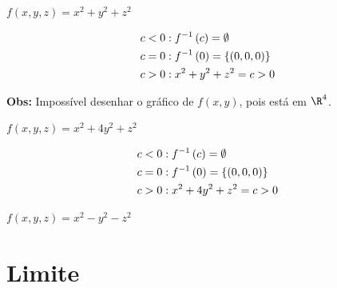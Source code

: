 \documentclass[11pt, oneside, a4paper]{gsm-l}
\begin{document}
\newpage

\begin{exem}
$f\left( {x,y,z} \right) = x^2  + y^2  + z^2$
\end{exem}

\begin{sol}
\[
\begin{gathered}
c < 0:f^{ - 1} \left( c \right) = \emptyset  \hfill \\
  c = 0:f^{ - 1} \left( 0 \right) = \left\{ {\left( {0,0,0} \right)} \right\} \hfill \\
c > 0:x^2  + y^2  + z^2  = c > 0 \hfill \\
\end{gathered}
\]



\textbf{Obs:} Impossível desenhar o gráfico de $f(x,y)$, pois está em $\R^4$.
\end{sol}

\begin{exem}
$f\left( {x,y,z} \right) = x^2  + 4y^2  + z^2$
\end{exem}

\begin{sol}
\[
\begin{gathered}
c < 0:f^{ - 1} \left( c \right) = \emptyset  \hfill \\
  c = 0:f^{ - 1} \left( 0 \right) = \left\{ {\left( {0,0,0} \right)} \right\} \hfill \\
c > 0:x^2  + 4y^2  + z^2  = c > 0 \hfill \\
\end{gathered}
\]


\end{sol}

\begin{exem}
$f\left( {x,y,z} \right) = x^2  - y^2  - z^2$
\end{exem}

\section{Limite} \label{sec10}
\end{document}
